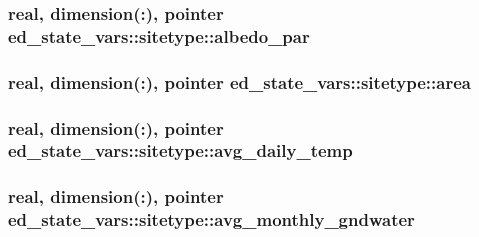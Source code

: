 \subsubsection[{\texorpdfstring{albedo\+\_\+par}{albedo_par}}]{\setlength{\rightskip}{0pt plus 5cm}real, dimension(\+:), pointer ed\+\_\+state\+\_\+vars\+::sitetype\+::albedo\+\_\+par}\hypertarget{structed__state__vars_1_1sitetype_a5c9368c3511b6cc4da23bd29a8e11894}{}\label{structed__state__vars_1_1sitetype_a5c9368c3511b6cc4da23bd29a8e11894}
\subsubsection[{\texorpdfstring{area}{area}}]{\setlength{\rightskip}{0pt plus 5cm}real, dimension(\+:), pointer ed\+\_\+state\+\_\+vars\+::sitetype\+::area}\hypertarget{structed__state__vars_1_1sitetype_a1eed035f74d70000625fcc1597421d7f}{}\label{structed__state__vars_1_1sitetype_a1eed035f74d70000625fcc1597421d7f}
\subsubsection[{\texorpdfstring{avg\+\_\+daily\+\_\+temp}{avg_daily_temp}}]{\setlength{\rightskip}{0pt plus 5cm}real, dimension(\+:), pointer ed\+\_\+state\+\_\+vars\+::sitetype\+::avg\+\_\+daily\+\_\+temp}\hypertarget{structed__state__vars_1_1sitetype_adea63a40388e8f25cce2bcc1380169d0}{}\label{structed__state__vars_1_1sitetype_adea63a40388e8f25cce2bcc1380169d0}
\subsubsection[{\texorpdfstring{avg\+\_\+monthly\+\_\+gndwater}{avg_monthly_gndwater}}]{\setlength{\rightskip}{0pt plus 5cm}real, dimension(\+:), pointer ed\+\_\+state\+\_\+vars\+::sitetype\+::avg\+\_\+monthly\+\_\+gndwater}\hypertarget{structed__state__vars_1_1sitetype_acc3bd06ca1ef99aed73b53fd96cedbfa}{}\label{structed__state__vars_1_1sitetype_acc3bd06ca1ef99aed73b53fd96cedbfa}
